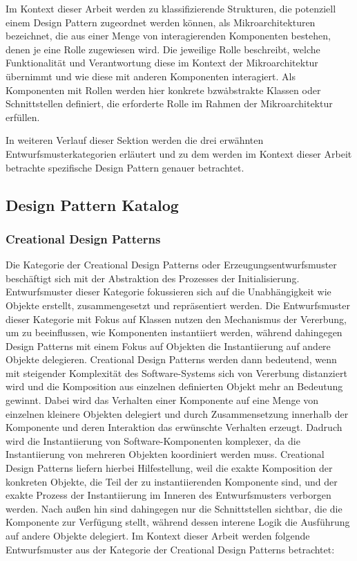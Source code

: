 Im Kontext dieser Arbeit werden zu klassifizierende Strukturen, die potenziell einem Design Pattern zugeordnet werden können, als Mikroarchitekturen bezeichnet, die aus einer Menge von interagierenden Komponenten bestehen, denen je eine Rolle zugewiesen wird. Die jeweilige Rolle beschreibt, welche Funktionalität und Verantwortung diese im Kontext der Mikroarchitektur übernimmt und wie diese mit anderen Komponenten interagiert.
Als Komponenten mit Rollen werden hier konkrete bzw\. abstrakte Klassen oder Schnittstellen definiert, die erforderte Rolle im Rahmen der Mikroarchitektur erfüllen.

In weiteren Verlauf dieser Sektion werden die drei erwähnten Entwurfsmusterkategorien erläutert und zu dem werden im Kontext dieser Arbeit betrachte spezifische Design Pattern genauer betrachtet.

\newpage

\subsection{Design Pattern Katalog}

\subsubsection{Creational Design Patterns}

Die Kategorie der Creational Design Patterns oder Erzeugungsentwurfsmuster beschäftigt sich mit der Abstraktion des Prozesses der Initialisierung\cite[S. 81]{gamma1994design}. Entwurfsmuster dieser Kategorie fokussieren sich auf die Unabhängigkeit wie Objekte erstellt, zusammengesetzt und repräsentiert werden.
Die Entwurfsmuster dieser Kategorie mit Fokus auf Klassen nutzen den Mechanismus der Vererbung, um zu beeinflussen, wie Komponenten instantiiert werden, während dahingegen Design Patterns mit einem Fokus auf Objekten die Instantiierung auf andere Objekte delegieren.
Creational Design Patterns werden dann bedeutend, wenn mit steigender Komplexität des Software-Systems sich von Vererbung distanziert wird und die Komposition aus einzelnen definierten Objekt mehr an Bedeutung gewinnt\cite[S. 81]{gamma1994design}. Dabei wird das Verhalten einer Komponente auf eine Menge von einzelnen kleinere Objekten delegiert und durch Zusammensetzung innerhalb der Komponente und deren Interaktion das erwünschte Verhalten erzeugt.
Dadruch wird die Instantiierung von Software-Komponenten komplexer, da die Instantiierung von mehreren Objekten koordiniert werden muss. Creational Design Patterns liefern hierbei Hilfestellung, weil die exakte Komposition der konkreten Objekte, die Teil der zu instantiierenden Komponente sind, und der exakte Prozess der Instantiierung im Inneren des Entwurfsmusters verborgen werden. Nach außen hin sind dahingegen nur die Schnittstellen sichtbar, die die Komponente zur Verfügung stellt, während dessen interene Logik die Ausführung auf andere Objekte delegiert.
Im Kontext dieser Arbeit werden folgende Entwurfsmuster aus der Kategorie der Creational Design Patterns betrachtet:

